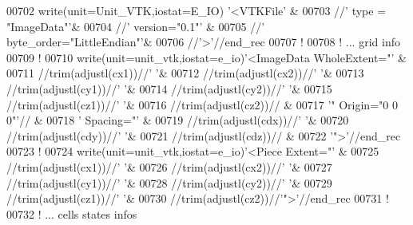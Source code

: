 \begin{DoxyCode}
00702 \textcolor{keyword}{write}(unit=Unit\_VTK,iostat=E\_IO)  \textcolor{stringliteral}{'<VTKFile'}                  &
00703                                 //\textcolor{stringliteral}{' type = "ImageData"'}&
00704                                 //\textcolor{stringliteral}{' version="0.1"'}            &
00705                                 //\textcolor{stringliteral}{' byte\_order="LittleEndian"'}&
00706                                 //\textcolor{stringliteral}{'>'}//end\_rec
00707 \textcolor{comment}{!}
00708 \textcolor{comment}{! ... grid info}
00709 \textcolor{comment}{!}
00710 \textcolor{keyword}{write}(unit=unit\_vtk,iostat=e\_io)\textcolor{stringliteral}{'<ImageData WholeExtent="'}  &
00711                                         //trim(adjustl(cx1))//\textcolor{stringliteral}{' '}&
00712                                         //trim(adjustl(cx2))//\textcolor{stringliteral}{' '}&
00713                                         //trim(adjustl(cy1))//\textcolor{stringliteral}{' '}&
00714                                         //trim(adjustl(cy2))//\textcolor{stringliteral}{' '}&
00715                                         //trim(adjustl(cz1))//\textcolor{stringliteral}{' '}&
00716                                         //trim(adjustl(cz2))//   &
00717                                         \textcolor{stringliteral}{'" Origin="0 0 0"'}//     &
00718                                         \textcolor{stringliteral}{' Spacing="'}             &
00719                                         //trim(adjustl(cdx))//\textcolor{stringliteral}{' '}&
00720                                         //trim(adjustl(cdy))//\textcolor{stringliteral}{' '}&
00721                                         //trim(adjustl(cdz))//   &
00722                                         \textcolor{stringliteral}{'">'}//end\_rec
00723 \textcolor{comment}{!}
00724 \textcolor{keyword}{write}(unit=unit\_vtk,iostat=e\_io)\textcolor{stringliteral}{'<Piece Extent="'}           &
00725                                    //trim(adjustl(cx1))//\textcolor{stringliteral}{' '}&
00726                                    //trim(adjustl(cx2))//\textcolor{stringliteral}{' '}&
00727                                    //trim(adjustl(cy1))//\textcolor{stringliteral}{' '}&
00728                                    //trim(adjustl(cy2))//\textcolor{stringliteral}{' '}&
00729                                    //trim(adjustl(cz1))//\textcolor{stringliteral}{' '}&
00730                                    //trim(adjustl(cz2))//\textcolor{stringliteral}{'">'}//end\_rec
00731 \textcolor{comment}{!}
00732 \textcolor{comment}{! ... cells states infos}

\end{DoxyCode}
